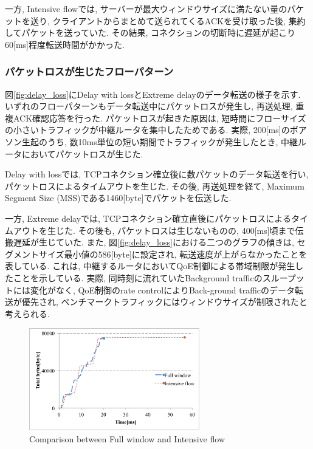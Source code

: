 \documentclass[10pt, a4paper, twocolumn]{jsarticle}
\begin{document}
一方, Intensive flowでは, サーバーが最大ウィンドウサイズに満たない量のパケットを送り,
クライアントからまとめて送られてくるACKを受け取った後, 集約してパケットを送っていた.
その結果, コネクションの切断時に遅延が起こり60[ms]程度転送時間がかかった.

\subsubsection{パケットロスが生じたフローパターン}
図\ref{fig:delay_loss}にDelay with lossとExtreme delayのデータ転送の様子を示す.
いずれのフローパターンもデータ転送中にパケットロスが発生し, 再送処理, 重複ACK確認応答を行った.
パケットロスが起きた原因は, 短時間にフローサイズの小さいトラフィックが中継ルータを集中したためである.
実際, 200[ms]のポアソン生起のうち, 数10ms単位の短い期間でトラフィックが発生したとき, 中継ルータにおいてパケットロスが生じた.

Delay with lossでは, TCPコネクション確立後に数パケットのデータ転送を行い, パケットロスによるタイムアウトを生じた.
その後, 再送処理を経て, Maximum Segment Size (MSS)である1460[byte]でパケットを伝送した.

一方, Extreme delayでは, TCPコネクション確立直後にパケットロスによるタイムアウトを生じた.
その後も, パケットロスは生じないものの, 400[ms]頃まで伝搬遅延が生じていた.
また, 図\ref{fig:delay_loss}における二つのグラフの傾きは, セグメントサイズ最小値の586[byte]に設定され,
転送速度が上がらなかったことを表している.
これは, 中継するルータにおいてQoE制御による帯域制限が発生したことを示している.
実際, 同時刻に流れていたBackground trafficのスループットには変化がなく, QoE制御のrate controlによりBack-ground
trafficのデータ転送が優先され, ベンチマークトラフィックにはウィンドウサイズが制限されたと考えられる.

\begin{figure}[h]
    \begin{center}
    \includegraphics[autoebb, width=210pt]{./img/full_intensive.pdf}
    \caption{Comparison between Full window and Intensive flow}
    \label{fig:full_intensive}
    \end{center}
\end{figure}
\end{document}
